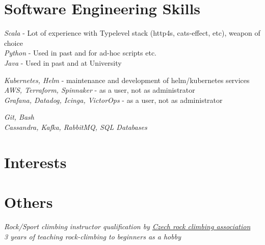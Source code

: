 \documentclass[10pt]{article} %
\begin{document}

\section{Software Engineering Skills}

{
\textit{Scala} - Lot of experience with Typelevel stack (http4s, cats-effect, etc), weapon of choice\\
\textit{Python} - Used in past and for ad-hoc scripts etc.\\
\textit{Java} - Used in past and at University\\
}


{
\textit{Kubernetes, Helm} - maintenance and development of helm/kubernetes services\\
\textit{AWS, Terraform, Spinnaker} - as a user, not as administrator \\
\textit{Grafana, Datadog, Icinga, VictorOps} - as a user, not as administrator \\
}

{
\textit{Git, Bash} \\
\textit{Cassandra, Kafka, RabbitMQ, SQL Databases}
}



\section{Interests}




\section{Others}
{
\textit{Rock/Sport climbing instructor qualification by \href{https://www.horosvaz.cz/}{Czech rock climbing association}}\\
\textit{3 years of teaching rock-climbing to beginners as a hobby}
}
\end{document}
